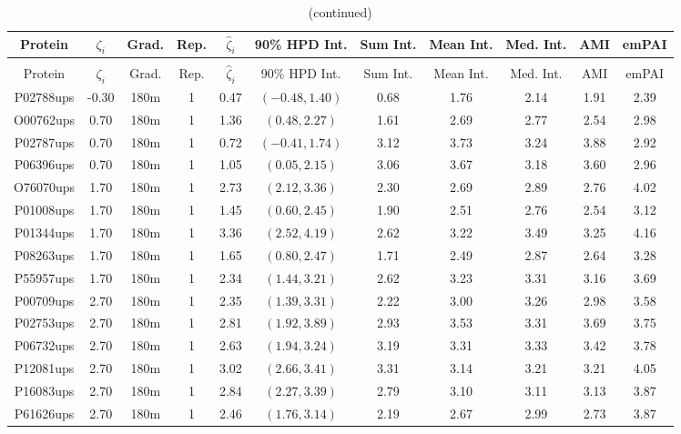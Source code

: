 \begin{landscape}
\begin{longtable}{cccc|cc|ccccc}
\caption{Detailed empirical results for UPS2 experiments, 180m gradients
\label{tab:ups2_180m}} \\
 Protein & $\zeta_i$ & Grad. & Rep. & $\hat{\zeta}_i$ & 90\% HPD Int. & Sum Int. & Mean Int. & Med. Int. & AMI & emPAI \\
\hline
\endfirsthead
\caption{(continued)} \\
 Protein & $\zeta_i$ & Grad. & Rep. & $\hat{\zeta}_i$ & 90\% HPD Int. & Sum Int. & Mean Int. & Med. Int. & AMI & emPAI \\
\hline
\endhead
P02788ups & -0.30 & 180m &   1 & 0.47 & $(-0.48, 1.40)$ & 0.68 & 1.76 & 2.14 & 1.91 & 2.39 \\ 
  O00762ups & 0.70 & 180m &   1 & 1.36 & $(0.48, 2.27)$ & 1.61 & 2.69 & 2.77 & 2.54 & 2.98 \\ 
  P02787ups & 0.70 & 180m &   1 & 0.72 & $(-0.41, 1.74)$ & 3.12 & 3.73 & 3.24 & 3.88 & 2.92 \\ 
  P06396ups & 0.70 & 180m &   1 & 1.05 & $(0.05, 2.15)$ & 3.06 & 3.67 & 3.18 & 3.60 & 2.96 \\ 
  O76070ups & 1.70 & 180m &   1 & 2.73 & $(2.12, 3.36)$ & 2.30 & 2.69 & 2.89 & 2.76 & 4.02 \\ 
  P01008ups & 1.70 & 180m &   1 & 1.45 & $(0.60, 2.45)$ & 1.90 & 2.51 & 2.76 & 2.54 & 3.12 \\ 
  P01344ups & 1.70 & 180m &   1 & 3.36 & $(2.52, 4.19)$ & 2.62 & 3.22 & 3.49 & 3.25 & 4.16 \\ 
  P08263ups & 1.70 & 180m &   1 & 1.65 & $(0.80, 2.47)$ & 1.71 & 2.49 & 2.87 & 2.64 & 3.28 \\ 
  P55957ups & 1.70 & 180m &   1 & 2.34 & $(1.44, 3.21)$ & 2.62 & 3.23 & 3.31 & 3.16 & 3.69 \\ 
  P00709ups & 2.70 & 180m &   1 & 2.35 & $(1.39, 3.31)$ & 2.22 & 3.00 & 3.26 & 2.98 & 3.58 \\ 
  P02753ups & 2.70 & 180m &   1 & 2.81 & $(1.92, 3.89)$ & 2.93 & 3.53 & 3.31 & 3.69 & 3.75 \\ 
  P06732ups & 2.70 & 180m &   1 & 2.63 & $(1.94, 3.24)$ & 3.19 & 3.31 & 3.33 & 3.42 & 3.78 \\ 
  P12081ups & 2.70 & 180m &   1 & 3.02 & $(2.66, 3.41)$ & 3.31 & 3.14 & 3.21 & 3.21 & 4.05 \\ 
  P16083ups & 2.70 & 180m &   1 & 2.84 & $(2.27, 3.39)$ & 2.79 & 3.10 & 3.11 & 3.13 & 3.87 \\ 
  P61626ups & 2.70 & 180m &   1 & 2.46 & $(1.76, 3.14)$ & 2.19 & 2.67 & 2.99 & 2.73 & 3.87 \\ 

\end{longtable}
\end{landscape}
